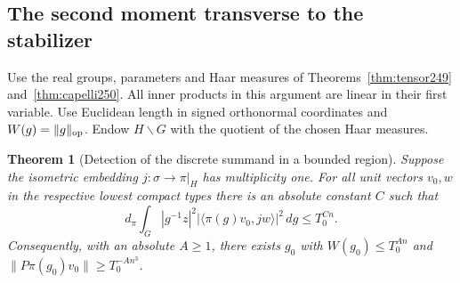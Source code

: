 \documentclass[a4paper,11pt]{article}
\newtheorem{theorem}[proposition]{Theorem}
\theoremstyle{definition}
\theoremstyle{remark}
\numberwithin{equation}{section}
\begin{document}
\subsection{The second moment transverse to the stabilizer}\label{nav:III-39}
Use the real groups, parameters and Haar measures of
Theorems~\ref{thm:tensor249} and~\ref{thm:capelli250}. All inner products
in this argument are linear in their first variable. Use Euclidean length
in signed orthonormal coordinates and \(W(g)=\|g\|_{\rm op}\). Endow
\(H\backslash G\) with the quotient of the chosen Haar measures.

\begin{theorem}[Detection of the discrete summand in a bounded region]
\label{thm:transverse250}
Suppose the isometric embedding \(j:\sigma\to\pi|_H\) has
multiplicity one. For all unit vectors \(v_0,w\) in the respective
lowest compact types there is an absolute constant \(C\) such that
\[
 d_\pi\int_G |g^{-1}z|^2 |\langle\pi(g)v_0,jw\rangle|^2\,dg
      \le T_0^{C n} .
\]
Consequently, with an absolute \(A\ge1\), there exists \(g_0\) with
\(W(g_0)\le T_0^{A n}\) and \(\|P\pi(g_0)v_0\|\ge T_0^{-A n^3}\).
\end{theorem}
\end{document}
